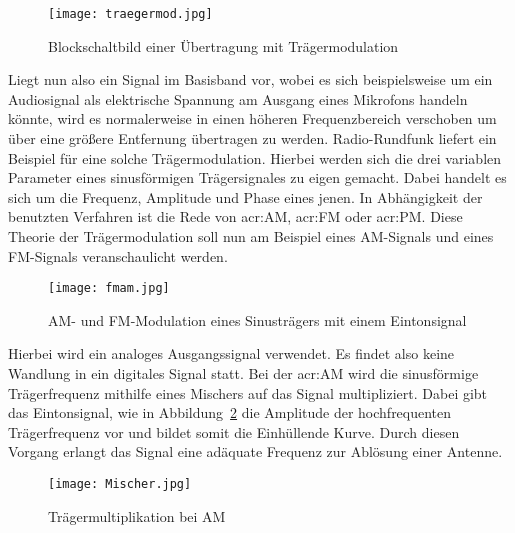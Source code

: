 \begin{figure}[H]
	\centering
	\texttt{[image: traegermod.jpg]}
	\caption[Blockschaltbild einer Übertragung mit Trägermodulation]{Blockschaltbild einer Übertragung mit Trägermodulation} 
	\cite{wernerNachrichtentechnikEinfuehrungFuer2010}
	\label{fig:traeger}
\end{figure}
Liegt nun also ein Signal im Basisband vor, wobei es sich beispielsweise um ein Audiosignal als elektrische Spannung am Ausgang eines Mikrofons handeln könnte, wird es normalerweise in einen höheren Frequenzbereich verschoben um über eine größere Entfernung übertragen zu werden. Radio-Rundfunk liefert ein Beispiel für eine solche Trägermodulation. Hierbei werden sich die drei variablen Parameter eines sinusförmigen Trägersignales zu eigen gemacht. Dabei handelt es sich um die Frequenz, Amplitude und Phase eines jenen. In Abhängigkeit der benutzten Verfahren ist die Rede von \gls{acr:AM}, \gls{acr:FM} oder \gls{acr:PM}.\cite{wernerNachrichtentechnikEinfuehrungFuer2010} Diese Theorie der Trägermodulation soll nun am Beispiel eines AM-Signals und eines FM-Signals veranschaulicht werden. 

\begin{figure}[H]
	\centering
	\texttt{[image: fmam.jpg]}
	\caption[AM- und FM-Modulation eines Sinusträgers mit einem Eintonsignal]{AM- und FM-Modulation eines Sinusträgers mit einem Eintonsignal} 
	\cite{wernerNachrichtentechnikEinfuehrungFuer2010}
	\label{fig:fmam}
\end{figure}

Hierbei wird ein analoges Ausgangssignal verwendet. Es findet also keine Wandlung in ein digitales Signal statt. Bei der \gls{acr:AM} wird die sinusförmige Trägerfrequenz mithilfe eines Mischers auf das Signal multipliziert. Dabei gibt das Eintonsignal, wie in Abbildung~\ref{fig:fmam} die Amplitude der hochfrequenten Trägerfrequenz vor und bildet somit die Einhüllende Kurve. Durch diesen Vorgang erlangt das Signal eine adäquate Frequenz zur Ablösung einer Antenne.\cite{klostermeyerDigitaleModulation2001}\cite{heuermannHochfrequenztechnikKomponentenFuer2018}

\begin{figure}[H]
	\centering
	\texttt{[image: Mischer.jpg]}
	\caption[Trägermultiplikation bei AM]{Trägermultiplikation bei AM} 
	\cite{wernerNachrichtentechnikEinfuehrungFuer2010}
	\label{fig:mischer}
\end{figure}

